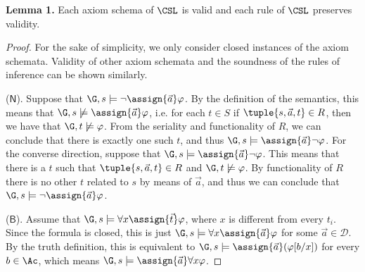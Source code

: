 \textbf{Lemma 1.}
    Each axiom schema of $\CSL$ is valid and each rule of $\CSL$ preserves validity.%

\begin{proof}
 For the sake of simplicity, we only consider closed instances of the axiom schemata. Validity of other axiom schemata and the soundness of the rules of inference can be shown similarly.
 
 ($\mathsf{N}$). Suppose that $\G,s\models \neg \assign{\vec{{a}}}\varphi$. By the definition of the semantics, this means that $\G,s\not \models \assign{\vec{{a}}} \varphi$, i.e. for each   $t\in S$ if   $\tuple{s,\vec{a},t}\in R$,  then we have that $\G,t\not\models \varphi$. From the seriality and functionality of $R$, we can conclude that there is exactly one such $t$, and thus $\G,s\models \assign{\vec{{a}}}\neg \varphi $. For the converse direction, suppose that $\G,s\models \assign{\vec{{a}}}\neg \varphi$. This means that there is a $t$ such that $\tuple{s,\vec{a},t}\in R$ and $\G,t\not\models \varphi$. By functionality of $R$ there is no other $t$ related to $s$ by means of $\vec{a}$, and thus we can conclude that $\G,s\models \neg \assign{\vec{{a}}}\varphi$. 

 ($\mathsf{B}$). Assume that $\G,s \models \forall x \assign{\vec t} \varphi$, where $x$ is different from every $t_i$. Since the formula is closed, this is just $\G,s \models \forall x \assign{\vec{ {a}}} \varphi$ for some $\vec{a}\in \mathcal D$. By the truth definition, this is equivalent to $\G,s \models \assign{\vec{{a}}} (\varphi [{b}/x])$ for every $b\in \Ac$, which means $\G,s\models \assign{\vec{ a}} \forall x \varphi $.
\end{proof}

